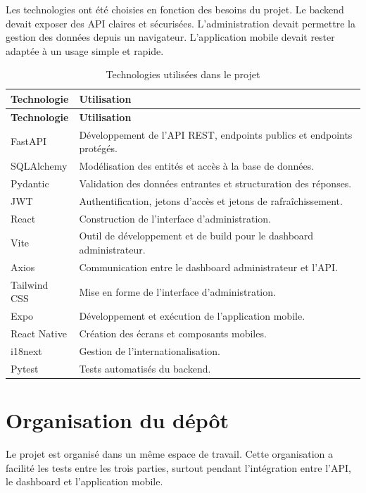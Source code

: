 Les technologies ont été choisies en fonction des besoins du projet. Le backend devait exposer des API
claires et sécurisées. L'administration devait permettre la gestion des données depuis un navigateur.
L'application mobile devait rester adaptée à un usage simple et rapide.

\begin{longtable}{L{4cm}L{10cm}}
    \caption{Technologies utilisées dans le projet}\\
    \toprule
    \textbf{Technologie} & \textbf{Utilisation} \\
    \midrule
    \endfirsthead
    \toprule
    \textbf{Technologie} & \textbf{Utilisation} \\
    \midrule
    \endhead
    FastAPI & Développement de l'API REST, endpoints publics et endpoints protégés. \\
    SQLAlchemy & Modélisation des entités et accès à la base de données. \\
    Pydantic & Validation des données entrantes et structuration des réponses. \\
    JWT & Authentification, jetons d'accès et jetons de rafraîchissement. \\
    React & Construction de l'interface d'administration. \\
    Vite & Outil de développement et de build pour le dashboard administrateur. \\
    Axios & Communication entre le dashboard administrateur et l'API. \\
    Tailwind CSS & Mise en forme de l'interface d'administration. \\
    Expo & Développement et exécution de l'application mobile. \\
    React Native & Création des écrans et composants mobiles. \\
    i18next & Gestion de l'internationalisation. \\
    Pytest & Tests automatisés du backend. \\
    \bottomrule
\end{longtable}

\section{Organisation du dépôt}

Le projet est organisé dans un même espace de travail. Cette organisation a facilité les tests entre les
trois parties, surtout pendant l'intégration entre l'API, le dashboard et l'application mobile.

